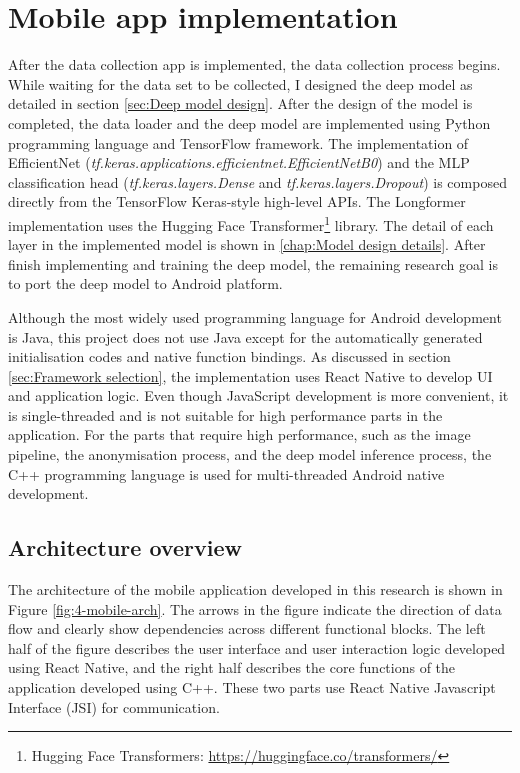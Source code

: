 \section{Mobile app implementation}
\label{sec:Mobile app implementation}
After the data collection app is implemented, the data collection process begins.
While waiting for the data set to be collected, I designed the deep model as detailed in section \ref{sec:Deep model design}.
After the design of the model is completed, the data loader and the deep model are implemented using Python programming language and TensorFlow framework.
The implementation of EfficientNet (\textit{tf.keras.applications.efficientnet.EfficientNetB0}) and the MLP classification head (\textit{tf.keras.layers.Dense} and \textit{tf.keras.layers.Dropout}) is composed directly from the TensorFlow Keras-style high-level APIs.
The Longformer implementation uses the Hugging Face Transformer\footnote{Hugging Face Transformers: \url{https://huggingface.co/transformers/}} library.
The detail of each layer in the implemented model is shown in \ref{chap:Model design details}.
After finish implementing and training the deep model, the remaining research goal is to port the deep model to Android platform.

Although the most widely used programming language for Android development is Java, this project does not use Java except for the automatically generated initialisation codes and native function bindings.
As discussed in section \ref{sec:Framework selection}, the implementation uses React Native to develop UI and application logic.
Even though JavaScript development is more convenient, it is single-threaded and is not suitable for high performance parts in the application.
For the parts that require high performance, such as the image pipeline, the anonymisation process, and the deep model inference process, the C++ programming language is used for multi-threaded Android native development.

\subsection{Architecture overview}
The architecture of the mobile application developed in this research is shown in Figure \ref{fig:4-mobile-arch}.
The arrows in the figure indicate the direction of data flow and clearly show dependencies across different functional blocks.
The left half of the figure describes the user interface and user interaction logic developed using React Native, and the right half describes the core functions of the application developed using C++.
These two parts use React Native Javascript Interface (JSI) for communication.

